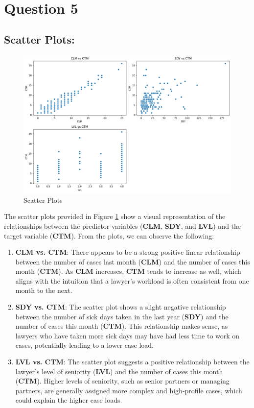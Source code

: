 \documentclass{article}
\begin{document}
\section*{Question 5}

\subsection*{Scatter Plots:}

\begin{figure}[H]
    \centering
    \includegraphics[width=1.1\textwidth]{ScatterPlots.png}
    \caption{Scatter Plots}
    \label{ScatterPlots}
\end{figure}

The scatter plots provided in Figure \ref*{ScatterPlots} show a visual representation of the relationships between the predictor variables (\textbf{CLM}, \textbf{SDY}, and \textbf{LVL}) and the target variable (\textbf{CTM}). From the plots, we can observe the following:

\begin{enumerate}
    \item \textbf{CLM vs. CTM}: There appears to be a strong positive linear relationship between the number of cases last month (\textbf{CLM}) and the number of cases this month (\textbf{CTM}). As \textbf{CLM} increases, \textbf{CTM} tends to increase as well, which aligns with the intuition that a lawyer's workload is often consistent from one month to the next.
    
    \item \textbf{SDY vs. CTM}: The scatter plot shows a slight negative relationship between the number of sick days taken in the last year (\textbf{SDY}) and the number of cases this month (\textbf{CTM}). This relationship makes sense, as lawyers who have taken more sick days may have had less time to work on cases, potentially leading to a lower case load.
    
    \item \textbf{LVL vs. CTM}: The scatter plot suggests a positive relationship between the lawyer's level of seniority (\textbf{LVL}) and the number of cases this month (\textbf{CTM}). Higher levels of seniority, such as senior partners or managing partners, are generally assigned more complex and high-profile cases, which could explain the higher case loads.
\end{enumerate}
\end{document}
